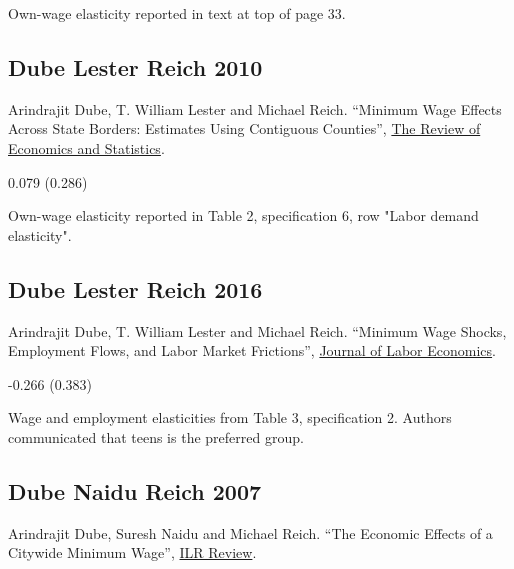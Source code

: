 \vspace{0.7em}

 Own-wage elasticity reported in text at top of page 33.

\subsection*{Dube Lester Reich 2010}
\vspace{-0.7em}

\noindent Arindrajit Dube, T. William Lester and Michael Reich. ``Minimum Wage Effects Across State Borders: Estimates Using Contiguous Counties'', \href{https://doi.org/10.1162/REST_a_00039}{The Review of Economics and Statistics}.

\vspace{0.7em}

 0.079 (0.286)

\vspace{0.7em}

 Own-wage elasticity reported in Table 2, specification 6, row "Labor demand elasticity".

\subsection*{Dube Lester Reich 2016}
\vspace{-0.7em}

\noindent Arindrajit Dube, T. William Lester and Michael Reich. ``Minimum Wage Shocks, Employment Flows, and Labor Market Frictions'', \href{https://doi.org/10.1086/685449}{Journal of Labor Economics}.

\vspace{0.7em}

 -0.266 (0.383)

\vspace{0.7em}

 Wage and employment elasticities from Table 3, specification 2. Authors communicated that teens is the preferred group.

\subsection*{Dube Naidu Reich 2007}
\vspace{-0.7em}

\noindent Arindrajit Dube, Suresh Naidu and Michael Reich. ``The Economic Effects of a Citywide Minimum Wage'', \href{https://doi.org/10.1177/001979390706000404}{ILR Review}.

